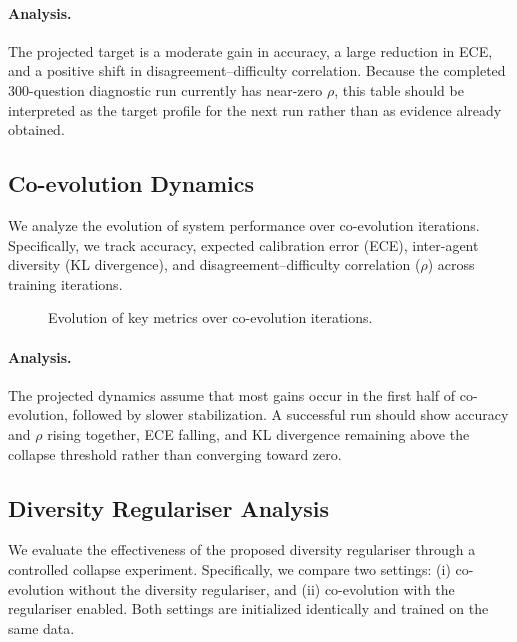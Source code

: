 \documentclass{article}
\begin{document}
\paragraph{Analysis.}
The projected target is a moderate gain in accuracy, a large reduction in ECE, and a positive shift in disagreement--difficulty correlation. Because the completed 300-question diagnostic run currently has near-zero $\rho$, this table should be interpreted as the target profile for the next run rather than as evidence already obtained.

\subsection{Co-evolution Dynamics}

We analyze the evolution of system performance over co-evolution iterations. Specifically, we track accuracy, expected calibration error (ECE), inter-agent diversity (KL divergence), and disagreement–difficulty correlation ($\rho$) across training iterations.

\begin{figure}[h]
\centering
{}
\caption{Evolution of key metrics over co-evolution iterations.}
\label{fig:dynamics}
\end{figure}

\paragraph{Analysis.}
The projected dynamics assume that most gains occur in the first half of co-evolution, followed by slower stabilization. A successful run should show accuracy and $\rho$ rising together, ECE falling, and KL divergence remaining above the collapse threshold rather than converging toward zero.

\subsection{Diversity Regulariser Analysis}

We evaluate the effectiveness of the proposed diversity regulariser through a controlled collapse experiment. Specifically, we compare two settings: (i) co-evolution without the diversity regulariser, and (ii) co-evolution with the regulariser enabled. Both settings are initialized identically and trained on the same data.
\end{document}
